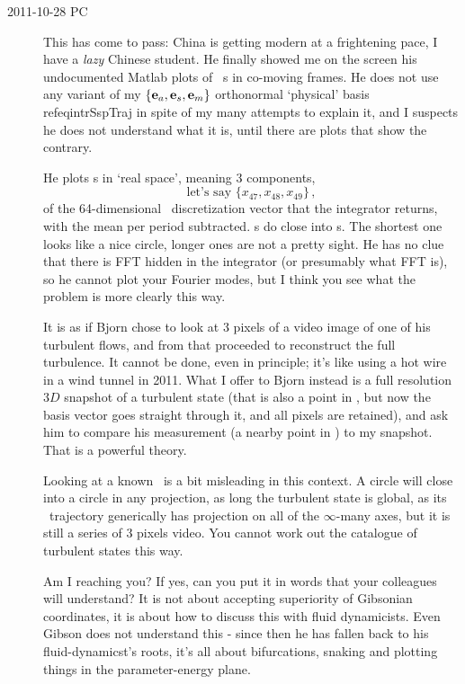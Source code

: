 \begin{description}
\item[2011-10-28 PC~~]
This has come to pass: China is getting modern at a frightening pace, I
have a \emph{lazy } Chinese student. He finally showed me on the screen
his undocumented Matlab plots of \KS\ \rpo s in co-moving frames. He does
not use any variant of my $\{{\bf e}_a, {\bf e}_s, {\bf e}_m\}$ orthonormal
`physical' basis  refeq{intrSspTraj} in spite of my many attempts to
explain it, and I suspects he does not understand what it is, until there
are plots that show the contrary.

\medskip

He plots \rpo s in `real space', meaning 3 components,
\[
\mbox{let's say } \{x_{47}, x_{48}, x_{49}\}
\,,
\]
of the 64-dimensional \KS\ discretization
vector that the integrator returns, with the mean {\phaseVel} per period
subtracted. \Rpo s do close into \po s. The shortest one looks like a
nice circle, longer ones are not a pretty sight. He has no clue that
there is FFT hidden in the integrator (or presumably what FFT is), so he
cannot plot your Fourier modes, but I think you see what the problem is
more clearly this way.

\medskip

It is as if Bjorn chose to look at 3 pixels of a
video image of one of his turbulent flows, and from that proceeded to
reconstruct the full turbulence. It cannot be done, even in principle;
it's like using a hot wire in a wind tunnel in 2011. What I offer to
Bjorn instead is a full resolution $3D$ snapshot of a turbulent state
(that is also a point in \statesp, but now the basis vector goes straight
through  it, and all pixels are retained), and ask him to compare his
measurement (a nearby point in \statesp) to my snapshot. That is a powerful
theory.

\medskip

Looking at a known \rpo\ is a bit misleading in this context. A circle
will close into a circle in any projection, as long the turbulent state
is global, as its \statesp\ trajectory generically has projection on all
of the $\infty$-many axes, but it is still a series of 3 pixels video.
You cannot work out the catalogue of turbulent states this way.

\medskip

Am I reaching you? If yes, can you put it in words that your colleagues
will understand? It is not about accepting superiority of Gibsonian
coordinates, it is about how to discuss this with fluid dynamicists. Even
Gibson does not understand this - since then he has fallen back to his
fluid-dynamicst's roots, it's all about bifurcations, snaking and plotting
things in the parameter-energy plane.



\end{description}
